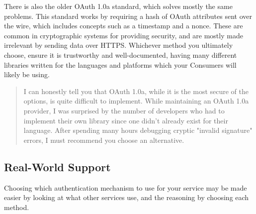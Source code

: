 \documentclass{book}
\begin{document}
There is also the older OAuth 1.0a \cite{RFC5849} standard, which solves mostly the same problems. This standard works by requiring a hash of OAuth attributes sent over the wire, which includes concepts such as a timestamp and a nonce. These are common in cryptographic systems for providing security, and are mostly made irrelevant by sending data over HTTPS. Whichever method you ultimately choose, ensure it is trustworthy and well-documented, having many different libraries written for the languages and platforms which your Consumers will likely be using.

\begin{quote}
I can honestly tell you that OAuth 1.0a, while it is the most secure of the options, is quite difficult to implement. While maintaining an OAuth 1.0a provider, I was surprised by the number of developers who had to implement their own library since one didn't already exist for their language. After spending many hours debugging cryptic "invalid signature" errors, I must recommend you choose an alternative.
\end{quote}

\subsection{Real-World Support}

Choosing which authentication mechanism to use for your service may be made easier by looking at what other services use, and the reasoning by choosing each method.
\end{document}
